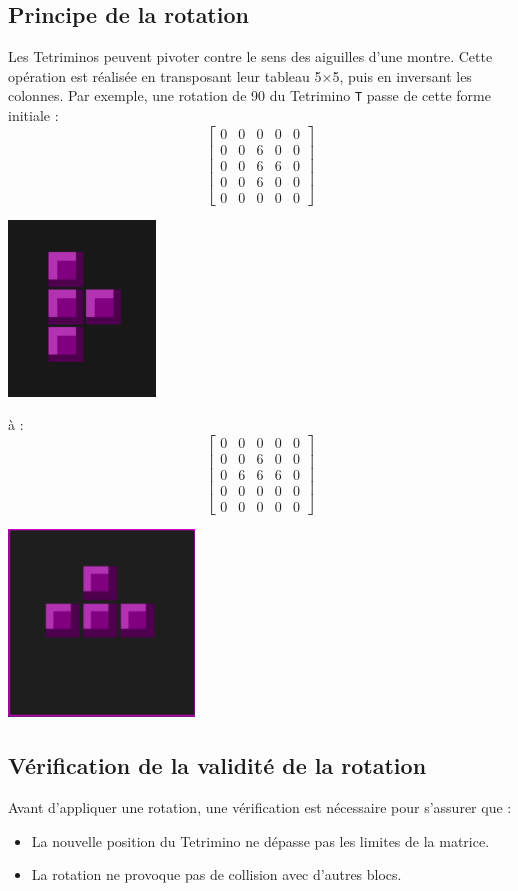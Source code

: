 \documentclass[12pt,a4paper]{report}
\begin{document}
\subsection{Principe de la rotation}
Les Tetriminos peuvent pivoter contre le sens des aiguilles d'une montre. Cette opération est réalisée en transposant leur tableau 5×5, puis en inversant les colonnes. Par exemple, une rotation de 90\textdegree{} du Tetrimino \texttt{T} passe de cette forme initiale :
\[
\begin{bmatrix}
0 & 0 & 0 & 0 & 0 \\
0 & 0 & 6 & 0 & 0 \\
0 & 0 & 6 & 6 & 0 \\
0 & 0 & 6 & 0 & 0 \\
0 & 0 & 0 & 0 & 0
\end{bmatrix}
\]
\begin{center}
\includegraphics[scale=1]{FIgure_T_inv_Tetris.png} 
\end{center}
à :
\[
\begin{bmatrix}
0 & 0 & 0 & 0 & 0 \\
0 & 0 & 6 & 0 & 0 \\
0 & 6 & 6 & 6 & 0 \\
0 & 0 & 0 & 0 & 0 \\
0 & 0 & 0 & 0 & 0
\end{bmatrix}
\]
\begin{center}
\includegraphics[scale=1]{Fegure_T_Tetris.png} 
\end{center}

\newpage
\subsection{Vérification de la validité de la rotation}
Avant d’appliquer une rotation, une vérification est nécessaire pour s'assurer que :
\begin{itemize}
    \item La nouvelle position du Tetrimino ne dépasse pas les limites de la matrice.
    \item La rotation ne provoque pas de collision avec d'autres blocs.
\end{itemize}
\end{document}
